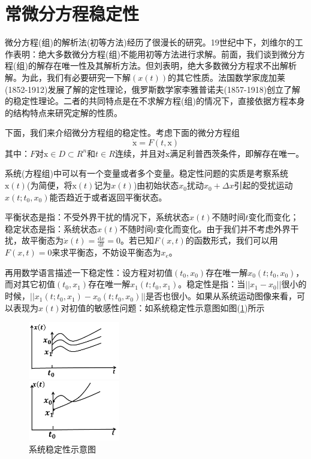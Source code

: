 \section{常微分方程稳定性}
	\par
	微分方程(组)的解析法(初等方法)经历了很漫长的研究。19世纪中下，刘维尔的工作表明：绝大多数微分方程(组)不能用初等方法进行求解。前面，我们谈到微分方程(组)的解存在唯一性及其解析方法。但刘表明，绝大多数微分方程求不出解析解。为此，我们有必要研究一下解$(x(t))$的其它性质。法国数学家庞加莱(1852-1912)发展了解的定性理论，俄罗斯数学家李雅普诺夫(1857-1918)创立了解的稳定性理论。二者的共同特点是在不求解方程(组)的情况下，直接依据方程本身的结构特点来研究定解的性质。
	\par
	下面，我们来介绍微分方程组的稳定性。考虑下面的微分方程组
	\[
		\dot{\mathrm{x}}=F(t,\mathrm{x})
	\]
	其中：$F$对$\mathrm{x}\in D\subset R^n$和$t\in R$连续，并且对$\mathrm{x}$满足利普西茨条件，即解存在唯一。
    \par
    系统(方程组)中可以有一个变量或者多个变量。稳定性问题的实质是考察系统$\mathrm{x}(t)$(为简便，将$\mathrm{x}(t)$记为$x(t)$)由初始状态$x_0$扰动$x_0+\Delta x$引起的受扰运动$x(t;t_0,x_0)$能否趋近于或者返回平衡状态。
    \par
    平衡状态是指：不受外界干扰的情况下，系统状态$x(t)$不随时间$t$变化而变化；稳定状态是指：系统状态$x(t)$不随时间$t$变化而变化。由于我们并不考虑外界干扰，故平衡态为$\dot{x}(t)=\frac{\mathrm{d}x}{\mathrm{d}t}=0$。若已知$F(x,t)$的函数形式，我们可以用$F(x,t)=0$来求平衡态，不妨设平衡态为$x_e$。
    \par
    再用数学语言描述一下稳定性：设方程对初值$(t_0,x_0)$存在唯一解$x_0(t;t_0,x_0)$，而对其它初值$(t_0,x_1)$存在唯一解$x_1(t;t_0,x_1)$。稳定性是指：当$||x_1-x_0||$很小的时候，$||x_1(t;t_0,x_1)-x_0(t;t_0,x_0)||$是否也很小。如果从系统运动图像来看，可以表现为$x(t)$对初值的敏感性问题：如系统稳定性示意图如图(\ref{fig:系统稳定性示意图})所示
	    \begin{figure}[H]
	    \centering
	    \begin{varwidth}[t]{\textwidth}
	    \vspace{0pt}
	    \includegraphics[width=4cm]{images/xtwdxsyt1.jpg}
		\end{varwidth}
		\qquad \qquad
		\begin{varwidth}[t]{\textwidth}
		\vspace{0pt}
		\includegraphics[width=4cm]{images/xtwdxsyt2.jpg}
		\end{varwidth}
		\caption{系统稳定性示意图}
		\label{fig:系统稳定性示意图}
		\end{figure}
